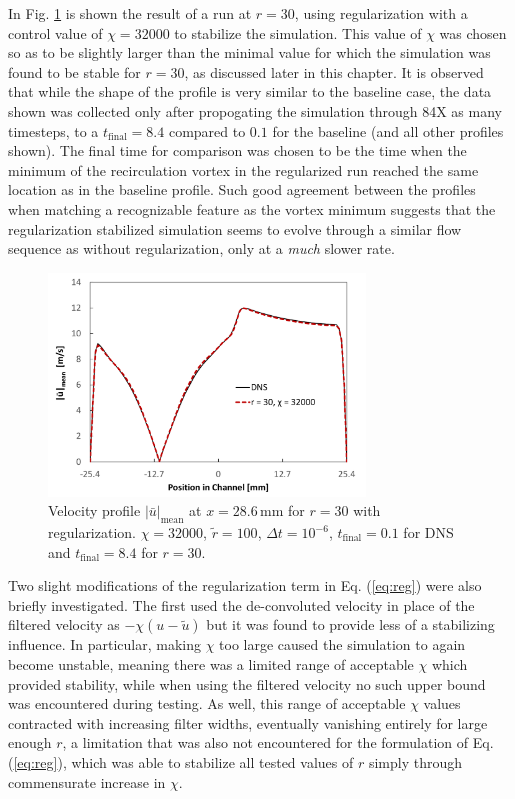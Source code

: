 In Fig. \ref{fig:line_data_reg} is shown the result of a run at $r=30$, using regularization with a control value of $\chi=32000$ to stabilize the simulation. This value of $\chi$ was chosen so as to be slightly larger than the minimal value for which the simulation was found to be stable for $r=30$, as discussed later in this chapter. It is observed that while the shape of the profile is very similar to the baseline case, the data shown was collected only after propogating the simulation through 84X as many timesteps, to a $t_\mathrm{final}=8.4$ compared to $0.1$ for the baseline (and all other profiles shown). The final time for comparison was chosen to be the time when the minimum of the recirculation vortex in the regularized run reached the same location as in the baseline profile. Such good agreement between the profiles when matching a recognizable feature as the vortex minimum suggests that the regularization stabilized simulation seems to evolve through a similar flow sequence as without regularization, only at a \emph{much} slower rate.

\begin{figure}[!htb]
\centering
\includegraphics[width=0.75\textwidth]{figures/line_data_reg.pdf}
\caption{Velocity profile $|\bar{u}|_{\mathrm{mean}}$ at $x=28.6\,\mathrm{mm}$ for $r=30$ with regularization. $\chi = 32000$, $\tilde{r}=100$, $\Delta t=10^{-6}$, $t_\mathrm{final}=0.1$ for DNS and $t_\mathrm{final}=8.4$ for $r=30$.}
\label{fig:line_data_reg}
\end{figure}

Two slight modifications of the regularization term in Eq. (\ref{eq:reg}) were also briefly investigated. The first used the de-convoluted velocity in place of the filtered velocity as $-\chi(u-\tilde{u})$ but it was found to provide less of a stabilizing influence. In particular, making $\chi$ too large caused the simulation to again become unstable, meaning there was a limited range of acceptable $\chi$ which provided stability, while when using the filtered velocity no such upper bound was encountered during testing. As well, this range of acceptable $\chi$ values contracted with increasing filter widths, eventually vanishing entirely for large enough $r$, a limitation that was also not encountered for the formulation of Eq. (\ref{eq:reg}), which was able to stabilize all tested values of $r$ simply through commensurate increase in $\chi$.

